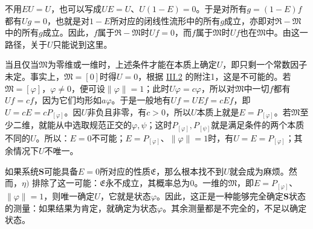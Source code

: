 \documentclass[fontsize=13pt,twoside,openany,headings=normal,parskip=false,bookmarkpackage=false,DIV=calc]{scrbook}
\begin{document}
不用$EU=U$，也可以写成$UE=U$、$U(1-E)=0$。于是对所有$g=(1-E)f$都有$Ug=0$，也就是对$1-E$所对应的闭线性流形中的所有$g$成立，亦即对$\mathfrak R-\mathfrak M$中的所有$g$成立。因此，$f$属于$\mathfrak R-\mathfrak M$时$Uf=0$，而$f$属于$\mathfrak M$时$Uf$也在$\mathfrak M$中。由这一路径，关于$U$只能说到这里。

当且仅当$\mathfrak M$为零维或一维时，上述条件才能在本质上确定$U$，即只剩一个常数因子未定。事实上，$\mathfrak M=[0]$时得$U=0$，根据 \hyperref[sec:III.2]{III.2} 的附注1，这是不可能的。若$\mathfrak M=[\varphi]$，$\varphi\ne0$，便可设$\|\varphi\|=1$；此时$U\varphi=c\varphi$，所以对$\mathfrak M$中一切$f$都有$Uf=cf$，因为它们均形如$a\varphi$。于是一般地有$Uf=UEf=cEf$，即$U=cE=cP_{[\varphi]}$。因$U$非负且非零，有$c>0$，所以$U$本质上就是$E=P_{[\varphi]}$。若$\mathfrak M$至少二维，就能从中选取规范正交的$\varphi,\allowbreak \psi$；这时$P_{[\varphi]},\allowbreak P_{[\psi]}$就是满足条件的两个本质不同的$U$。所以：$E=0$不可能；$E=P_{[\varphi]}$、$\|\varphi\|=1$时，有$U=E=P_{[\varphi]}$；其余情况下$U$不唯一。

如果系统$\boldsymbol{S}$可能具备$E=0$所对应的性质$\mathfrak E$，那么根本找不到$U$就会成为麻烦。然而，\hyperref[post:III.5.eta]{$\eta)$} 排除了这一可能：$\mathfrak E$永不成立，其概率总为$0$。一维的$\mathfrak M$，即$E=P_{[\varphi]}$、$\|\varphi\|=1$，则唯一确定$U$，它就是状态$\varphi$。因此，这正是一种能够完全确定$\boldsymbol{S}$状态的测量：如果结果为肯定，就确定为状态$\varphi$。其余测量都是不完全的，不足以确定状态。
\end{document}
